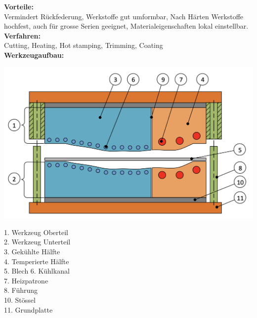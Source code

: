 \textbf{Vorteile:}\\
 Vermindert Rückfederung, Werkstoffe gut umformbar, Nach Härten Werkstoffe hochfest, auch für grosse Serien geeignet, Materialeigenschaften lokal einstellbar.\\

 \textbf{Verfahren:}\\
Cutting, Heating, Hot stamping, Trimming, Coating\\

\textbf{Werkzeugaufbau:}\\
\begin{minipage}{0.65\linewidth}
    \includegraphics[width=0.8\linewidth]{src/images/Warmblechumformung.png}
\end{minipage}
\begin{minipage}{0.49\linewidth}
    \begin{tiny}
    1. Werkzeug Oberteil \\
    2. Werkzeug Unterteil \\
    3. Gekühlte Hälfte \\
    4. Temperierte Hälfte \\
    5. Blech
    6. Kühlkanal \\
    7. Heizpatrone \\
    8. Führung \\
    10. Stössel\\
    11. Grundplatte
    \end{tiny}
\end{minipage}
